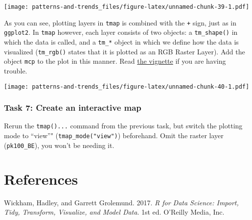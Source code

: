 \documentclass[]{book}
\begin{document}
\texttt{[image: patterns-and-trends\_files/figure-latex/unnamed-chunk-39-1.pdf]}

As you can see, plotting layers in \texttt{tmap} is combined with the \texttt{+} sign, just as in \texttt{ggplot2}. In \texttt{tmap} however, each layer consists of two objects: a \texttt{tm\_shape()} in which the data is called, and a \texttt{tm\_*} object in which we define how the data is visualized (\texttt{tm\_rgb()} states that it is plotted as an RGB Raster Layer). Add the object \texttt{mcp} to the plot in this manner. Read \href{https://cran.r-project.org/web/packages/tmap/vignettes/tmap-getstarted.html}{the vignette} if you are having trouble.

\texttt{[image: patterns-and-trends\_files/figure-latex/unnamed-chunk-40-1.pdf]}

\hypertarget{task-7-create-an-interactive-map}{%
\subsection{Task 7: Create an interactive map}\label{task-7-create-an-interactive-map}}

Rerun the \texttt{tmap()...} command from the previous task, but switch the plotting mode to ``view''" (\texttt{tmap\_mode("view")}) beforehand. Omit the raster layer (\texttt{pk100\_BE}), you won't be needing it.

\hypertarget{references}{%
\chapter*{References}\label{references}}

\hypertarget{refs}{}
\leavevmode\hypertarget{ref-wickham2017}{}%
Wickham, Hadley, and Garrett Grolemund. 2017. \emph{R for Data Science: Import, Tidy, Transform, Visualize, and Model Data}. 1st ed. O'Reilly Media, Inc.
\end{document}
